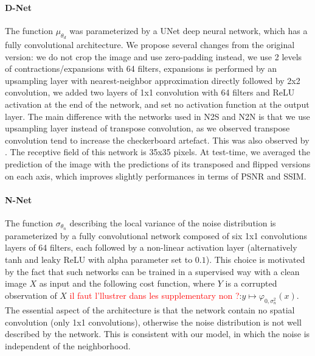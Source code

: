 \documentclass{article}
\begin{document}
\paragraph{D-Net}
The function $\mu_{\theta_d}$ was parameterized by a UNet \cite{ronneberger2015u} deep neural network, which has a fully convolutional architecture.
We propose several changes from the original version: we do not crop the image and use zero-padding instead, we use 2 levels of contractions/expansions with 64 filters, expansions is performed by an upsampling layer with nearest-neighbor approximation directly followed by 2x2 convolution, we added two layers of 1x1 convolution with 64 filters and ReLU activation at the end of the network, and set no activation function at the output layer.
The main difference with the networks used in N2S and N2N is that we use upsampling layer instead of transpose convolution, as we observed transpose convolution tend to increase the checkerboard artefact. This was also observed by \cite{kobayashi2020image}.
The receptive field of this network is 35x35 pixels.
At test-time, we averaged the prediction of the image with the predictions of its transposed and flipped versions on each axis, which improves slightly performances in terms of PSNR and SSIM.


\paragraph{N-Net}
The function $\sigma_{\theta_n}$ describing the local variance of the noise distribution is parameterized by a fully convolutional network composed of six 1x1 convolutions layers of 64 filters, each followed by a non-linear activation layer (alternatively tanh and leaky ReLU with alpha parameter set to $0.1$).
This choice is motivated by the fact that such networks can be trained in a supervised way with a clean image $X$ as input and the following cost function, where $Y$ is a corrupted observation of $X$ \textcolor{red}{il faut l'llustrer dans les supplementary non ?}:$y\mapsto\varphi_{0,\sigma_n^2}(x)$.
The essential aspect of the architecture is that the network contain no spatial convolution (only 1x1 convolutions), otherwise the noise distribution is not well described by the network. This is consistent with our model, in which the noise is independent of the neighborhood.
\end{document}
